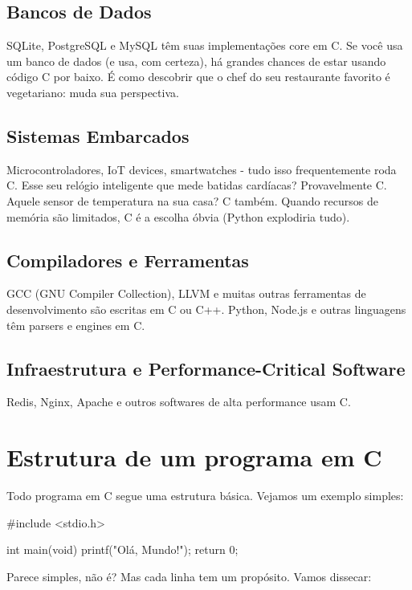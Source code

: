 \subsection{Bancos de Dados}

SQLite, PostgreSQL e MySQL têm suas implementações core em C. Se você usa um banco de dados (e usa, com certeza), há grandes chances de estar usando código C por baixo. É como descobrir que o chef do seu restaurante favorito é vegetariano: muda sua perspectiva.

\subsection{Sistemas Embarcados}

Microcontroladores, IoT devices, smartwatches - tudo isso frequentemente roda C. Esse seu relógio inteligente que mede batidas cardíacas? Provavelmente C. Aquele sensor de temperatura na sua casa? C também. Quando recursos de memória são limitados, C é a escolha óbvia (Python explodiria tudo).

\subsection{Compiladores e Ferramentas}

GCC (GNU Compiler Collection), LLVM e muitas outras ferramentas de desenvolvimento são escritas em C ou C++. Python, Node.js e outras linguagens têm parsers e engines em C.

\subsection{Infraestrutura e Performance-Critical Software}

Redis, Nginx, Apache e outros softwares de alta performance usam C.

\section{Estrutura de um programa em C}

Todo programa em C segue uma estrutura básica. Vejamos um exemplo simples:

\begin{ccode}
  #include <stdio.h>

  int main(void)
  {
    printf("Olá, Mundo!\n");
    return 0;
  }
\end{ccode}

Parece simples, não é? Mas cada linha tem um propósito. Vamos dissecar:

